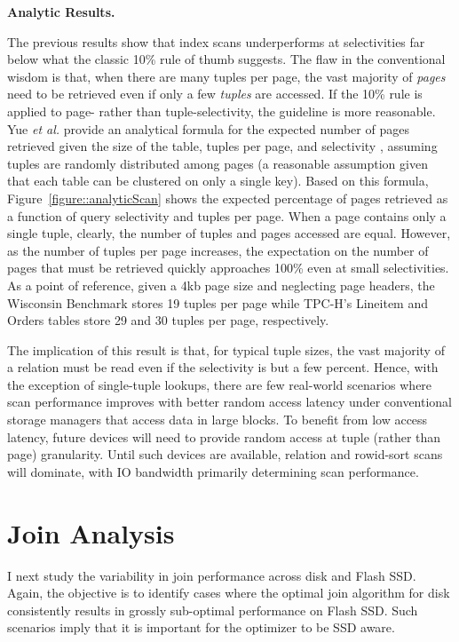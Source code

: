 \textbf{Analytic Results.}

The previous results show that index scans underperforms at selectivities far below what the classic 10\% rule of thumb suggests. 
The flaw in the conventional wisdom is that, when there are many tuples per page, the vast majority of \emph{pages} need to be retrieved even if only a few \emph{tuples} are accessed.
If the 10\% rule is applied to page- rather than tuple-selectivity, the guideline is more reasonable.
Yue \emph{et al.} provide an analytical formula for the expected number of pages retrieved given the size of the table, tuples per page, and selectivity \cite{Yue1975}, assuming tuples are randomly distributed among pages (a reasonable assumption given that each table can be clustered on only a single key).
Based on this formula, Figure~\ref{figure::analyticScan} shows the expected percentage of pages retrieved as a function of query selectivity and tuples per page.
When a page contains only a single tuple, clearly, the number of tuples and pages accessed are equal.
However, as the number of tuples per page increases, the expectation on the number of pages that must be retrieved quickly approaches 100\% even at small selectivities.
As a point of reference, given a 4kb page size and neglecting page headers, the Wisconsin Benchmark stores 19 tuples per page while TPC-H's Lineitem and Orders tables store 29 and 30 tuples per page, respectively.

The implication of this result is that, for typical tuple sizes, the vast majority of a relation must be read even if the selectivity is but a few percent.
Hence, with the exception of single-tuple lookups, there are few real-world scenarios where scan performance improves with better random access latency under conventional storage managers that access data in large blocks.
To benefit from low access latency, future devices will need to provide random access at tuple (rather than page) granularity.
Until such devices are available, relation and rowid-sort scans will dominate, with IO bandwidth primarily determining scan performance.

\section{Join Analysis}
\label{sec:FlashOpti:Joins}

I next study the variability in join performance across disk and Flash SSD.  
Again, the objective is to identify cases where the optimal join algorithm for disk consistently results in grossly sub-optimal performance on Flash SSD.
Such scenarios imply that it is important for the optimizer to be SSD aware.

